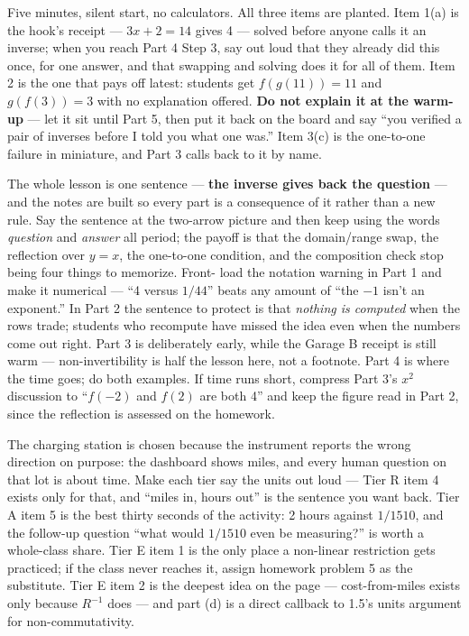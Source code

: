 \documentclass[10pt]{article}
\begin{document}
\begin{teachernote}[Warm-Up]
Five minutes, silent start, no calculators. All three items are planted. Item
1(a) is the hook's receipt --- $3x + 2 = 14$ gives 4 --- solved before anyone
calls it an inverse; when you reach Part 4 Step 3, say out loud that they
already did this once, for one answer, and that swapping and solving does it for
all of them. Item 2 is the one that pays off latest: students get
$f(g(11)) = 11$ and $g(f(3)) = 3$ with no explanation offered. \textbf{Do not
explain it at the warm-up} --- let it sit until Part 5, then put it back on the
board and say ``you verified a pair of inverses before I told you what one
was.'' Item 3(c) is the one-to-one failure in miniature, and Part 3 calls back
to it by name.
\end{teachernote}

\begin{teachernote}
The whole lesson is one sentence --- \textbf{the inverse gives back the
question} --- and the notes are built so every part is a consequence of it
rather than a new rule. Say the sentence at the two-arrow picture and then keep
using the words \textit{question} and \textit{answer} all period; the payoff is
that the domain/range swap, the reflection over $y = x$, the one-to-one
condition, and the composition check stop being four things to memorize. Front-
load the notation warning in Part 1 and make it numerical --- ``4 versus
$1/44$'' beats any amount of ``the $-1$ isn't an exponent.'' In Part 2 the
sentence to protect is that \textit{nothing is computed} when the rows trade;
students who recompute have missed the idea even when the numbers come out
right. Part 3 is deliberately early, while the Garage B receipt is still warm
--- non-invertibility is half the lesson here, not a footnote. Part 4 is where
the time goes; do both examples. If time runs short, compress Part 3's $x^2$
discussion to ``$f(-2)$ and $f(2)$ are both 4'' and keep the figure read in
Part 2, since the reflection is assessed on the homework.
\end{teachernote}

\begin{teachernote}
The charging station is chosen because the instrument reports the wrong
direction on purpose: the dashboard shows miles, and every human question on
that lot is about time. Make each tier say the units out loud --- Tier R item 4
exists only for that, and ``miles in, hours out'' is the sentence you want back.
Tier A item 5 is the best thirty seconds of the activity: 2 hours against
$1/1510$, and the follow-up question ``what would $1/1510$ even be measuring?''
is worth a whole-class share. Tier E item 1 is the only place a non-linear
restriction gets practiced; if the class never reaches it, assign homework
problem 5 as the substitute. Tier E item 2 is the deepest idea on the page ---
cost-from-miles exists only because $R^{-1}$ does --- and part (d) is a direct
callback to 1.5's units argument for non-commutativity.
\end{teachernote}
\end{document}
